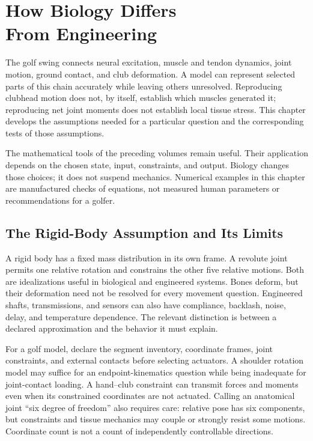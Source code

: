 \chapter[How Biology Differs From Engineering]{How Biology Differs\\From Engineering}
\label{ch:bio-vs-eng}

The golf swing connects neural excitation, muscle and tendon dynamics, joint
motion, ground contact, and club deformation. A model can represent selected
parts of this chain accurately while leaving others unresolved. Reproducing
clubhead motion does not, by itself, establish which muscles generated it;
reproducing net joint moments does not establish local tissue stress. This
chapter develops the assumptions needed for a particular question and the
corresponding tests of those assumptions.

The mathematical tools of the preceding volumes remain useful. Their
application depends on the chosen state, input, constraints, and output.
Biology changes those choices; it does not suspend mechanics. Numerical
examples in this chapter are manufactured checks of equations, not measured
human parameters or recommendations for a golfer.

\section{The Rigid-Body Assumption and Its Limits}

A rigid body has a fixed mass distribution in its own frame. A revolute joint
permits one relative rotation and constrains the other five relative motions.
Both are idealizations useful in biological and engineered systems. Bones
deform, but their deformation need not be resolved for every movement question.
Engineered shafts, transmissions, and sensors can also have compliance,
backlash, noise, delay, and temperature dependence. The relevant distinction
is between a declared approximation and the behavior it must explain.

For a golf model, declare the segment inventory, coordinate frames, joint
constraints, and external contacts before selecting actuators. A shoulder
rotation model may suffice for an endpoint-kinematics question while being
inadequate for joint-contact loading. A hand--club constraint can transmit
forces and moments even when its constrained coordinates are not actuated.
Calling an anatomical joint ``six degree of freedom'' also requires care:
relative pose has six components, but constraints and tissue mechanics may
couple or strongly resist some motions. Coordinate count is not a count of
independently controllable directions.

